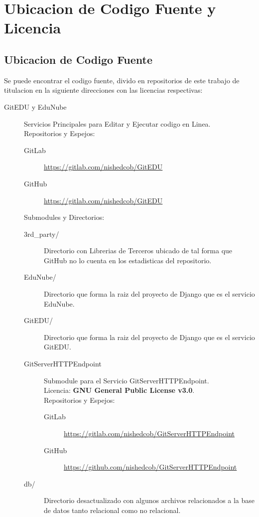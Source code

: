 
\chapter{Ubicacion de Codigo Fuente y Licencia}
\label{AnexoI} 

\section{Ubicacion de Codigo Fuente}
Se puede encontrar el codigo fuente, divido en repositorios de este trabajo de titulacion en la siguiente direcciones con las licencias respectivas:
\begin{description}
	\item[GitEDU y EduNube] Servicios Principales para Editar y Ejecutar codigo en Linea.\\
    Repositorios y Espejos:
    \begin{description}
    	\item[GitLab] \url{https://gitlab.com/nishedcob/GitEDU}
        \item[GitHub] \url{https://gitlab.com/nishedcob/GitEDU}
    \end{description}
    Submodules y Directorios:
    \begin{description}
    	\item[3rd\_party/] Directorio con Librerias de Terceros ubicado de tal forma que GitHub no lo cuenta en los estadisticas del repositorio.
        \item[EduNube/] Directorio que forma la raiz del proyecto de Django que es el servicio EduNube.
        \item[GitEDU/] Directorio que forma la raiz del proyecto de Django que es el servicio GitEDU.
        \item[GitServerHTTPEndpoint] Submodule para el Servicio GitServerHTTPEndpoint. \\
        Licencia: \textbf{GNU General Public License v3.0}. \\
        Repositorios y Espejos:
        \begin{description}
        	\item[GitLab] \sloppy \url{https://gitlab.com/nishedcob/GitServerHTTPEndpoint}
            \item[GitHub] \sloppy \url{https://github.com/nishedcob/GitServerHTTPEndpoint}
        \end{description}
        \item[db/] Directorio desactualizado con algunos archivos relacionados a la base de datos tanto relacional como no relacional.

\end{description}
\end{description}
